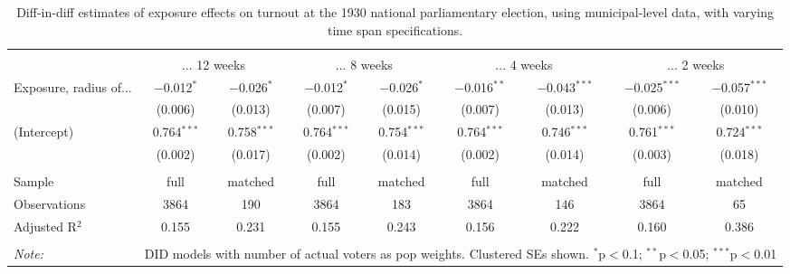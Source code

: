 
\begin{table}[!htbp] \centering 
  \caption{Diff-in-diff estimates of exposure effects on turnout at the 1930 national parliamentary election, using municipal-level data, with varying time span specifications.\vspace{-.25cm}} 
  \label{tab:turnout-timespan-dd-1930comm} 
\scriptsize 
\begin{tabular}{@{\extracolsep{5pt}}lcccccccc} 
\\[-1.8ex]\hline 
\hline \\[-1.8ex] 
 & \multicolumn{2}{c}{... 12 weeks} & \multicolumn{2}{c}{... 8 weeks} & \multicolumn{2}{c}{... 4 weeks} & \multicolumn{2}{c}{... 2 weeks} \\ 
 \cmidrule(r){2-3}\cmidrule(r){4-5}\cmidrule(r){6-7}\cmidrule(r){8-9}Exposure, radius of... & $-$0.012$^{*}$ & $-$0.026$^{*}$ & $-$0.012$^{*}$ & $-$0.026$^{*}$ & $-$0.016$^{**}$ & $-$0.043$^{***}$ & $-$0.025$^{***}$ & $-$0.057$^{***}$ \\ 
  & (0.006) & (0.013) & (0.007) & (0.015) & (0.007) & (0.013) & (0.006) & (0.010) \\ 
  (Intercept) & 0.764$^{***}$ & 0.758$^{***}$ & 0.764$^{***}$ & 0.754$^{***}$ & 0.764$^{***}$ & 0.746$^{***}$ & 0.761$^{***}$ & 0.724$^{***}$ \\ 
  & (0.002) & (0.017) & (0.002) & (0.014) & (0.002) & (0.014) & (0.003) & (0.018) \\ 
 \hline \\[-1.8ex] 
Sample & full & matched & full & matched & full & matched & full & matched \\ 
Observations & 3864 & 190 & 3864 & 183 & 3864 & 146 & 3864 & 65 \\ 
Adjusted R$^{2}$ & 0.155 & 0.231 & 0.155 & 0.243 & 0.156 & 0.222 & 0.160 & 0.386 \\ 
\hline 
\hline \\[-1.8ex] 
\textit{Note:}  & \multicolumn{8}{r}{DID models with number of actual voters as pop weights. Clustered SEs shown. $^{*}$p$<$0.1; $^{**}$p$<$0.05; $^{***}$p$<$0.01} \\ 
\end{tabular} 
\end{table} 
